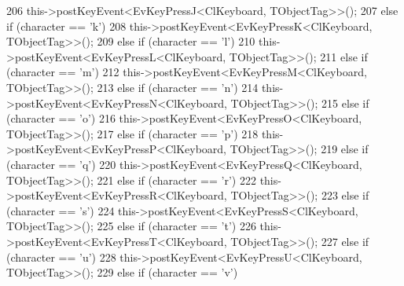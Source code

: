 \begin{DoxyCode}
{206                                 this->postKeyEvent<EvKeyPressJ<ClKeyboard, TObjectTag>>();
207                         \textcolor{keywordflow}{else} \textcolor{keywordflow}{if} (character == \textcolor{charliteral}{'k'})
208                                 this->postKeyEvent<EvKeyPressK<ClKeyboard, TObjectTag>>();
209                         \textcolor{keywordflow}{else} \textcolor{keywordflow}{if} (character == \textcolor{charliteral}{'l'})
210                                 this->postKeyEvent<EvKeyPressL<ClKeyboard, TObjectTag>>();
211                         \textcolor{keywordflow}{else} \textcolor{keywordflow}{if} (character == \textcolor{charliteral}{'m'})
212                                 this->postKeyEvent<EvKeyPressM<ClKeyboard, TObjectTag>>();
213                         \textcolor{keywordflow}{else} \textcolor{keywordflow}{if} (character == \textcolor{charliteral}{'n'})
214                                 this->postKeyEvent<EvKeyPressN<ClKeyboard, TObjectTag>>();
215                         \textcolor{keywordflow}{else} \textcolor{keywordflow}{if} (character == \textcolor{charliteral}{'o'})
216                                 this->postKeyEvent<EvKeyPressO<ClKeyboard, TObjectTag>>();
217                         \textcolor{keywordflow}{else} \textcolor{keywordflow}{if} (character == \textcolor{charliteral}{'p'})
218                                 this->postKeyEvent<EvKeyPressP<ClKeyboard, TObjectTag>>();
219                         \textcolor{keywordflow}{else} \textcolor{keywordflow}{if} (character == \textcolor{charliteral}{'q'})
220                                 this->postKeyEvent<EvKeyPressQ<ClKeyboard, TObjectTag>>();
221                         \textcolor{keywordflow}{else} \textcolor{keywordflow}{if} (character == \textcolor{charliteral}{'r'})
222                                 this->postKeyEvent<EvKeyPressR<ClKeyboard, TObjectTag>>();
223                         \textcolor{keywordflow}{else} \textcolor{keywordflow}{if} (character == \textcolor{charliteral}{'s'})
224                                 this->postKeyEvent<EvKeyPressS<ClKeyboard, TObjectTag>>();
225                         \textcolor{keywordflow}{else} \textcolor{keywordflow}{if} (character == \textcolor{charliteral}{'t'})
226                                 this->postKeyEvent<EvKeyPressT<ClKeyboard, TObjectTag>>();
227                         \textcolor{keywordflow}{else} \textcolor{keywordflow}{if} (character == \textcolor{charliteral}{'u'})
228                                 this->postKeyEvent<EvKeyPressU<ClKeyboard, TObjectTag>>();
229                         \textcolor{keywordflow}{else} \textcolor{keywordflow}{if} (character == \textcolor{charliteral}{'v'})
}
\end{DoxyCode}
